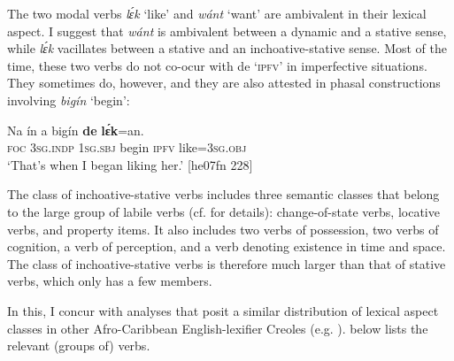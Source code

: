 \z

The two modal verbs \textit{lɛ́k} ‘like’ and \textit{wánt} ‘want’ are ambivalent in their lexical aspect. I suggest that \textit{wánt} is ambivalent between a dynamic and a stative sense, while \textit{lɛ́k} vacillates between a stative and an inchoative-stative sense. Most of the time, these two verbs do not co-ocur with de ‘\textsc{ipfv}’ in imperfective situations. They sometimes do, however, and they are also attested in phasal constructions involving \textit{bigín} ‘begin’: 


\ea%
    \label{ex:key:301}
    \gll Na  ín    a    bigín  \textbf{de}  \textbf{lɛ́k}=an.\\
\textsc{foc}  \textsc{3sg.indp}  \textsc{1sg.sbj}  begin  \textsc{ipfv}  like\textsc{=3sg.obj}\\

\glt ‘That’s when I began liking her.’ [he07fn 228]
\z

The class of inchoative-stative verbs includes three semantic classes that belong to the large group of labile verbs (cf.  for details): change-of-state verbs, locative verbs, and property items. It also includes two verbs of possession, two verbs of cognition, a verb of perception, and a verb denoting existence in time and space. The class of inchoative-stative verbs is therefore much larger than that of stative verbs, which only has a few members. 

In this, I concur with analyses that posit a similar distribution of lexical aspect classes in other Afro-Caribbean English-lexifier Creoles (e.g. \citealt{Winford1993,Migge2000}).  below lists the relevant (groups of) verbs.

